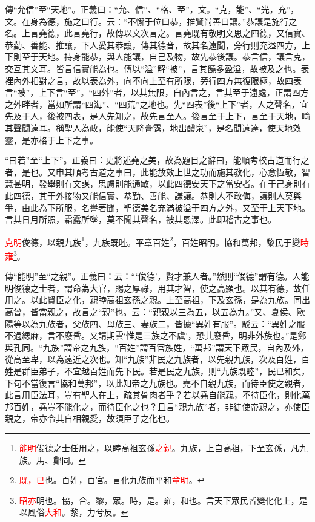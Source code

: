 {\noindent\zhuan{}\fzbyks 傳“允信”至“天地”。正義曰：“允、信”、“格、至”，文。“克，能”、“光，充”，文。在身為德，施之曰行。云：“不懈于位曰恭，推賢尚善曰讓。”恭讓是施行之名。上言堯德，此言堯行，故傳以文次言之。言堯既有敬明文思之四德，又信實、恭勤、善能、推讓，下人愛其恭讓，傳其德音，故其名遠聞，旁行則充溢四方，上下則至于天地。持身能恭，與人能讓，自己及物，故先恭後讓。恭言信，讓言克，交互其文耳。皆言信實能為也。傳以“溢”解“被”，言其饒多盈溢，故被及之也。表裡內外相對之言，故以表為外，向不向上至有所限，旁行四方無復限極，故四表言“被”，上下言“至”。“四外”者，以其無限，自內言之，言其至于遠處，正謂四方之外畔者，當如所謂“四海”、“四荒”之地也。先“四表”後“上下”者，人之聲名，宜先及于人，後被四表，是人先知之，故先言至人。後言至于上下，言至于天地，喻其聲聞遠耳。稱聖人為政，能使“天降膏露，地出醴泉”，是名聞遠達，使天地效靈，是亦格于上下之事。 \par}

{\noindent\shu{}\fzkt “曰若”至“上下”。正義曰：史將述堯之美，故為題目之辭曰，能順考校古道而行之者，是也。又申其順考古道之事曰，此能放效上世之功而施其教化，心意恆敬，智慧甚明，發舉則有文謀，思慮則能通敏，以此四德安天下之當安者。在于己身則有此四德，其于外接物又能信實、恭勤、善能、謙讓。恭則人不敢侮，讓則人莫與爭，由此為下所服，名譽著聞，聖德美名充滿被溢于四方之外，又至于上天下地。言其日月所照，霜露所墜，莫不聞其聲名，被其恩澤。此即稽古之事也。 \par}


\textcolor{red}{克明}俊德，以親九族\footnote{\textcolor{red}{能明}俊德之士任用之，以睦高祖玄孫\textcolor{red}{之親}。九族，上自高祖，下至玄孫，凡九族。馬、鄭同。}，九族既睦。平章百姓\footnote{\textcolor{red}{既，已}也。百姓，百官。言化九族而平和\textcolor{red}{章明}。}，百姓昭明。協和萬邦，黎民于變\textcolor{red}{時雍}\footnote{\textcolor{red}{昭亦}明也。協，合。黎，眾。時，是。雍，和也。言天下眾民皆變化化上，是以風俗\textcolor{red}{大和}。黎，力兮反。}。

{\noindent\zhuan{}\fzbyks 傳“能明”至“之親”。正義曰：云：“‘俊德’，賢才兼人者。”然則“俊德”謂有德。人能明俊德之士者，謂命為大官，賜之厚祿，用其才智，使之高顯也。以其有德，故任用之。以此賢臣之化，親睦高祖玄孫之親。上至高祖，下及玄孫，是為九族。同出高曾，皆當親之，故言之“親”也。云：“親親以三為五，以五為九。”又、夏侯、歐陽等以為九族者，父族四、母族三、妻族二，皆據“異姓有服”。駁云：“異姓之服不過緦麻，言不廢昏。又請期雲‘惟是三族之不虞’，恐其廢昏，明非外族也。”是鄭與孔同。“九族”謂帝之九族，“百姓”謂百官族姓，“萬邦”謂天下眾民，自內及外，從高至卑，以為遠近之次也。知“九族”非民之九族者，以先親九族，次及百姓，百姓是群臣弟子，不宜越百姓而先下民。若是民之九族，則“九族既睦”，民已和矣，下句不當復言“協和萬邦”，以此知帝之九族也。堯不自親九族，而待臣使之親者，此言用臣法耳，豈有聖人在上，疏其骨肉者乎？若以堯自能親，不待臣化，則化萬邦百姓，堯豈不能化之，而待臣化之也？且言“親九族”者，非徒使帝親之，亦使臣親之，帝亦令其自相親愛，故須臣子之化也。 \par}

